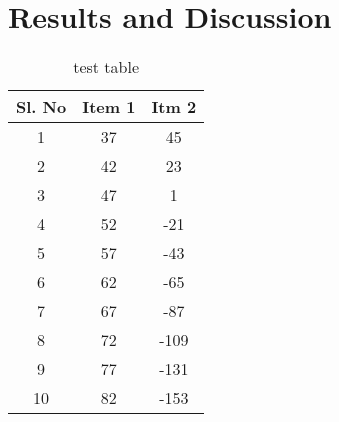 \chapter{Results and Discussion}%

\lipsum[5-7] %
	
\begin{table}[h!]
	\centering
	\caption{test table}
	\vspace*{5pt}
	\begin{tabular}{|c|c|c|}
		\hline
		Sl. No & Item 1 & Itm 2 \\ \hline
		1      & 37     & 45    \\ \hline
		2      & 42     & 23    \\ \hline
		3      & 47     & 1     \\ \hline
		4      & 52     & -21   \\ \hline
		5      & 57     & -43   \\ \hline
		6      & 62     & -65   \\ \hline
		7      & 67     & -87   \\ \hline
		8      & 72     & -109  \\ \hline
		9      & 77     & -131  \\ \hline
		10     & 82     & -153  \\ \hline
	\end{tabular}
\end{table}
